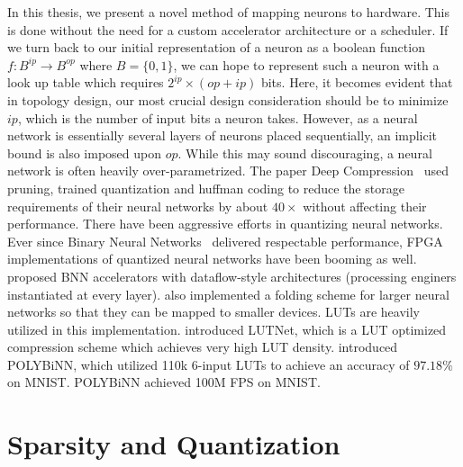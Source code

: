 In this thesis, we present a novel method of mapping neurons to hardware. This is done without the need for a custom accelerator architecture or a scheduler. If we turn back to our initial representation of a neuron as a boolean function $f: B^{ip} \rightarrow B^{op}$ where $B = \{0, 1\}$, we can hope to represent such a neuron with a look up table which requires $2^{ip} \times (op + ip)$ bits. Here, it becomes evident that in topology design, our most crucial design consideration should be to minimize $ip$, which is the number of input bits a neuron takes. However, as a neural network is essentially several layers of neurons placed sequentially, an implicit bound is also imposed upon $op$. While this may sound discouraging, a neural network is often heavily over-parametrized. The paper Deep Compression~\cite{han2015deep} used pruning, trained quantization and huffman coding to reduce the storage requirements of their neural networks by about $40\times$ without affecting their performance. 
There have been aggressive efforts in quantizing neural networks. Ever since Binary Neural Networks~\cite{courbariaux2016binarized} delivered respectable performance, FPGA implementations of quantized neural networks have been booming as well. \cite{umuroglu+:FPGA2017finn} proposed BNN accelerators with dataflow-style architectures (processing enginers instantiated at every layer). \cite{umuroglu+:FPGA2017finn} also implemented a folding scheme for larger neural networks so that they can be mapped to smaller devices. LUTs are heavily utilized in this implementation. \cite{wang2019lutnet} introduced LUTNet, which is a LUT optimized compression scheme which achieves very high LUT density. \cite{abdelsalam2018polybinn} introduced POLYBiNN, which utilized 110k 6-input LUTs to achieve an accuracy of $97.18\%$ on MNIST. POLYBiNN achieved 100M FPS on MNIST.
\section{Sparsity and Quantization}
